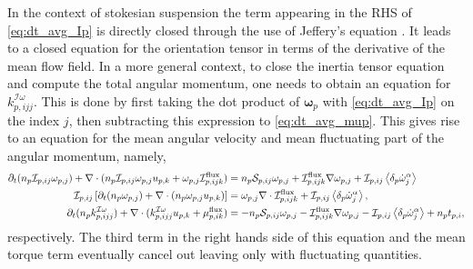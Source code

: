 In the context of stokesian suspension the term appearing in the RHS of \ref{eq:dt_avg_Ip} is directly closed through the use of Jeffery's equation \citet{guazzelli2011}.
It leads to a closed equation for the orientation tensor in terms of the derivative of the mean flow field. 
In a more general context, to close the inertia tensor equation and compute the total angular momentum, one needs to obtain an equation for $k^{\mathcal{I}\omega}_{p,ijj}$. 
This is done by first taking the dot product of $\bm{\omega}_{p}$ with \ref{eq:dt_avg_Ip} on the index $j$, then subtracting this expression to \ref{eq:dt_avg_mup}.
This gives rise to an equation for the mean angular velocity and mean fluctuating part of the angular momentum, namely, 
\begin{align}
    \label{eq:dt_avg_kIp}
    \pddt (n_p\mathcal{I}_{p,ij}\omega_{p,j})
    + \div (n_p\mathcal{I}_{p,ij}\omega_{p,j} u_{p,k}
    + \omega_{p,j}\mathcal{I}^\text{flux}_{p,ijk})
    &= 
    n_p \mathcal{S}_{p,ij}\omega_{p,j}
    + \mathcal{I}_{p,ijk}^\text{flux}\grad \omega_{p,j}
    + \mathcal{I}_{p,ij}\pavg{\dot{\omega}^\alpha_j}
    \\
    \label{eq:dt_avg_kIp}
    \mathcal{I}_{p,ij}\left[
        \pddt (n_p\omega_{p,j})
        + \div (n_p\omega_{p,j} u_{p,k})
    \right]
    &= 
    \omega_{p,j}\div\mathcal{I}_{p,ijk}^\text{flux} 
    + \mathcal{I}_{p,ij}\pavg{\dot{\omega}^\alpha_j},
    \\
    \pddt (n_p k^{\mathcal{I}\omega}_{p,ijj})
    + \div (k^{\mathcal{I}\omega}_{p,ijj} u_{p,k}
    + \mu_{p,ik}^\text{flux}
    )
    &= 
    - n_p \mathcal{S}_{p,ij}\omega_{p,j}
    - \mathcal{I}_{p,ijk}^\text{flux}\grad \omega_{p,j}
    - \mathcal{I}_{p,ij}\pavg{\dot{\omega}^\alpha_j}
    + n_p t_{p,i},
\end{align}
respectively. 
The third term in the right hands side of this equation and the mean torque term eventually cancel out leaving only with fluctuating quantities. 
